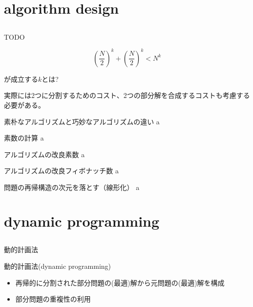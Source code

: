 \documentclass{beamer}
\subtitle{}
\begin{document}
\begin{frame}[fragile]{}
\titlepage
\end{frame}

\section{algorithm design}		%
\subsection{}

\begin{frame}[fragile]{}{}
TODO


\[
\left(\frac{N}{2}\right)^k + \left(\frac{N}{2}\right)^k < N^k
\]

が成立する$k$とは?

実際には2つに分割するためのコスト、2つの部分解を合成するコストも考慮する必要がある。
\end{frame}



\begin{frame}[fragile]{素朴なアルゴリズムと巧妙なアルゴリズムの違い}{}
a
\end{frame}

\begin{frame}[fragile]{素数の計算}{}
a
\end{frame}

\begin{frame}[fragile]{アルゴリズムの改良}{素数}
a
\end{frame}

\begin{frame}[fragile]{アルゴリズムの改良}{フィボナッチ数}
a
\end{frame}

\begin{frame}[fragile]{問題の再帰構造の次元を落とす（線形化）}{}
a
\end{frame}

\section{dynamic programming}		%
\subsection{}

\begin{frame}[fragile]{動的計画法}{}

\begin{block}{動的計画法(dynamic programming)}
\begin{itemize}%
\item 再帰的に分割された部分問題の(最適)解から元問題の(最適)解を構成
\item 部分問題の重複性の利用
\end{itemize}
\end{block}


\end{frame}
\end{document}
